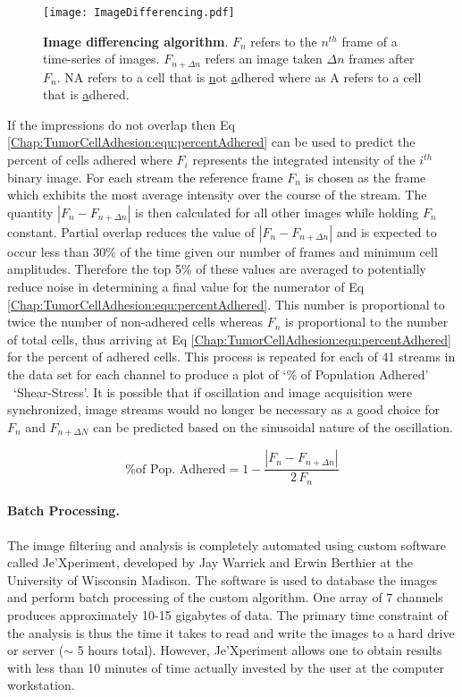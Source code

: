 \begin{figure}[!bt]
\centering
\texttt{[image: ImageDifferencing.pdf]}
\caption{\textbf{Image differencing algorithm}. $F_{n}$ refers to the $n^{th}$ frame of a time-series of images. $F_{n+\Delta n}$ refers an image taken $\Delta n$ frames after $F_{n}$. NA refers to a cell that is \underline{n}ot \underline{a}dhered where as A refers to a cell that is \underline{a}dhered.}
\label{Chap:TumorCellAdhesion:fig:differencing}
\end{figure}

If the impressions do not overlap then Eq \ref{Chap:TumorCellAdhesion:equ:percentAdhered} can be used to predict the percent of cells adhered where $F_{i}$ represents the integrated intensity of the $i^{th}$ binary image. For each stream the reference frame $F_{n}$ is chosen as the frame which exhibits the most average intensity over the course of the stream. The quantity $\left| F_{n}-F_{n+\Delta n}\right|$ is then calculated for all other images while holding $F_{n}$ constant. Partial overlap reduces the value of $\left| F_{n}-F_{n+\Delta n}\right|$ and is expected to occur less than 30\% of the time given our number of frames and minimum cell amplitudes. Therefore the top 5\% of these values are averaged to potentially reduce noise in determining a final value for the numerator of Eq \ref{Chap:TumorCellAdhesion:equ:percentAdhered}. This number is proportional to twice the number of non-adhered cells whereas $F_{n}$ is proportional to the number of total cells, thus arriving at Eq \ref{Chap:TumorCellAdhesion:equ:percentAdhered} for the percent of adhered cells. This process is repeated for each of 41 streams in the data set for each channel to produce a plot of `\% of Population Adhered' \vs\ `Shear-Stress'. It is possible that if oscillation and image acquisition were synchronized, image streams would no longer be necessary as a good choice for $F_{n}$ and $F_{n+\Delta N}$ can be predicted based on the sinusoidal nature of the oscillation.

\begin{equation}
\textrm{\% of Pop. Adhered} = 1 - \frac{\left| F_{n}-F_{n+\Delta n}\right|}{2 \, F_{n}}
\label{Chap:TumorCellAdhesion:equ:percentAdhered}
\end{equation}

\paragraph{Batch Processing.}The image filtering and analysis is completely automated using custom software called Je'Xperiment, developed by Jay Warrick and Erwin Berthier at the University of Wisconsin Madison. The software is used to database the images and perform batch processing of the custom algorithm. One array of 7 channels produces approximately 10-15 gigabytes of data. The primary time constraint of the analysis is thus the time it takes to read and write the images to a hard drive or server ($\sim$ 5 hours total). However, Je'Xperiment allows one to obtain results with less than 10 minutes of time actually invested by the user at the computer workstation.

